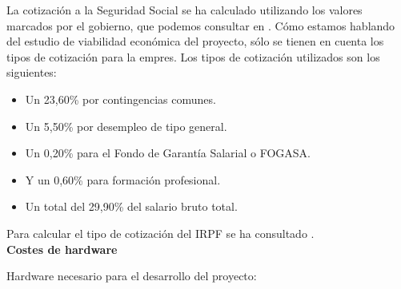 La cotización a la Seguridad Social se ha calculado utilizando los valores marcados por el gobierno, que podemos consultar en \cite{salariogob}. Cómo estamos hablando del estudio de viabilidad económica del proyecto, sólo se tienen en cuenta los tipos de cotización para la empres. Los tipos de cotización utilizados son los siguientes:
\begin{itemize}
\item
	Un 23,60\% por contingencias comunes.
\item
	Un 5,50\% por desempleo de tipo general.
\item
	Un 0,20\% para el Fondo de Garantía Salarial o FOGASA.
\item
	Y un 0,60\% para formación profesional.
\item
	Un total del 29,90\% del salario bruto total.
\end{itemize}

Para calcular el tipo de cotización del IRPF se ha consultado \cite{irpfgob}.\\

\textbf{Costes de hardware}

Hardware necesario para el desarrollo del proyecto:


